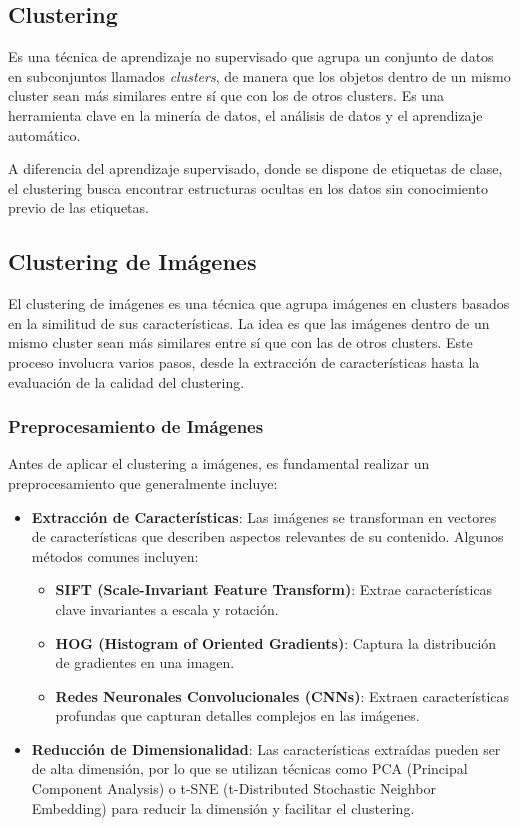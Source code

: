\subsection{Clustering}
Es una técnica de aprendizaje no supervisado que agrupa un conjunto de datos en subconjuntos llamados \textit{clusters}, de manera que los objetos dentro de un mismo cluster sean más similares entre sí que con los de otros clusters. Es una herramienta clave en la minería de datos, el análisis de datos y el aprendizaje automático.

A diferencia del aprendizaje supervisado, donde se dispone de etiquetas de clase, el clustering busca encontrar estructuras ocultas en los datos sin conocimiento previo de las etiquetas.

\subsection{Clustering de Imágenes}
El clustering de imágenes es una técnica que agrupa imágenes en clusters basados en la similitud de sus características. La idea es que las imágenes dentro de un mismo cluster sean más similares entre sí que con las de otros clusters. Este proceso involucra varios pasos, desde la extracción de características hasta la evaluación de la calidad del clustering.

\subsubsection{Preprocesamiento de Imágenes}
Antes de aplicar el clustering a imágenes, es fundamental realizar un preprocesamiento que generalmente incluye:

\begin{itemize}
    \item \textbf{Extracción de Características}: Las imágenes se transforman en vectores de características que describen aspectos relevantes de su contenido. Algunos métodos comunes incluyen:
        \begin{itemize}
            \item \textbf{SIFT (Scale-Invariant Feature Transform)}: Extrae características clave invariantes a escala y rotación.
            \item \textbf{HOG (Histogram of Oriented Gradients)}: Captura la distribución de gradientes en una imagen.
            \item \textbf{Redes Neuronales Convolucionales (CNNs)}: Extraen características profundas que capturan detalles complejos en las imágenes.
        \end{itemize}
    \item \textbf{Reducción de Dimensionalidad}: Las características extraídas pueden ser de alta dimensión, por lo que se utilizan técnicas como PCA (Principal Component Analysis) o t-SNE (t-Distributed Stochastic Neighbor Embedding) para reducir la dimensión y facilitar el clustering.
\end{itemize}

